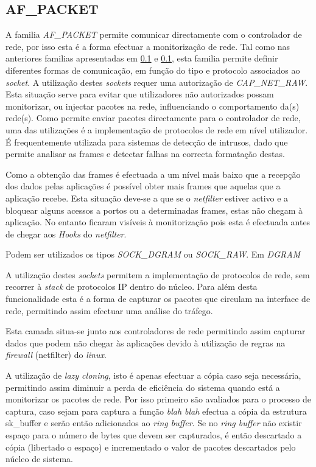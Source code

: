 \subsection{AF\_PACKET}

A familia \textit{AF\_PACKET} permite comunicar directamente com o controlador de rede, por isso esta é a forma efectuar a monitorização de rede. 
 Tal como nas anteriores familias apresentadas em \ref{} e \ref{}, esta familia permite definir diferentes formas de comunicação, em função do tipo e protocolo associados ao \textit{socket}.
 A utilização destes \textit{sockets} requer uma autorização de \textit{CAP\_NET\_RAW}.
 Esta situação serve para evitar que utilizadores não autorizados possam monitorizar, ou injectar pacotes na rede, influenciando o comportamento da(s) rede(s).
 Como permite enviar pacotes directamente para o controlador de rede, uma das utilizações é a implementação de protocolos de rede em nível utilizador.
 É frequentemente utilizada para sistemas de detecção de intrusos, dado que permite analisar as frames e detectar falhas na correcta formatação destas.

 Como a obtenção das frames é efectuada a um nível mais baixo que a recepção dos dados pelas aplicações é possível obter mais frames que aquelas que a aplicação recebe. 
 Esta situação deve-se a que se o \textit{netfilter} estiver activo e a bloquear alguns acessos a portos ou a determinadas frames, estas não chegam à aplicação.
 No entanto ficaram visíveis à monitorização pois esta é efectuada antes de chegar aos \textit{Hooks} do \textit{netfilter}.
 

 Podem ser utilizados os tipos \textit{SOCK\_DGRAM} ou \textit{SOCK\_RAW}. Em \textit{DGRAM}
 

 A utilização destes \textit{sockets} permitem a implementação de protocolos de rede, sem recorrer à \textit{stack} de protocolos IP dentro do núcleo.
 Para além desta funcionalidade esta é a forma de capturar os pacotes que circulam na interface de rede, permitindo assim efectuar uma análise do tráfego.

 Esta camada situa-se junto aos controladores de rede permitindo assim capturar dados que podem não chegar às aplicações devido à utilização de regras na \textit{firewall} (netfilter) do \textit{linux}.

 A utilização de \textit{lazy cloning}, isto é apenas efectuar a cópia caso seja necessária, permitindo assim diminuir a perda de eficiência do sistema quando está a monitorizar os pacotes de rede.
 Por isso primeiro são avaliados para o processo de captura, caso sejam para captura a função \textit{blah blah} efectua a cópia da estrutura sk\_buffer e serão então adicionados ao \textit{ring buffer}.
 Se no \textit{ring buffer} não existir espaço para o número de bytes que devem ser capturados, é então descartado a cópia (libertado o espaço) e incrementado o valor de pacotes descartados pelo núcleo de sistema.

